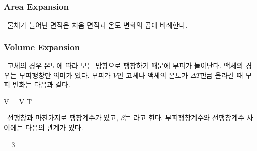 \subsubsection{Area Expansion}
%
\ 물체가 늘어난 면적은 처음 면적과 온도 변화의 곱에 비례한다.

\subsubsection{Volume Expansion}
%
\ 고체의 경우 온도에 따라 모든 방향으로 팽창하기 때문에 부피가 늘어난다.
액체의 경우는 부피팽창만 의미가 있다.
부피가 $V$인 고체나 액체의 온도가 $\Delta T$만큼 올라갈 때 부피 변화는 다음과 같다.
\begin{eqbox} \Delta V = V \beta \Delta T
\label{eq:volume_expansion} \end{eqbox}
%
\ 선팽창과 마찬가지로 팽창계수가 있고, $\beta$는 라고 한다.
부피팽창계수와 선팽창계수 사이에는 다음의 관계가 있다.
\begin{eqbox} \beta = 3 \alpha
\label{eq:volume–linear_expansion_relation} \end{eqbox}
\clearpage




